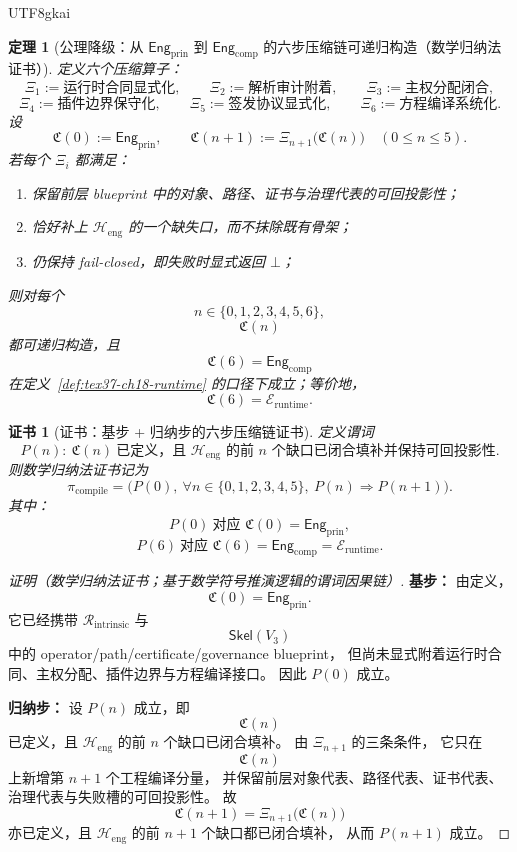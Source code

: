 \documentclass[12pt]{article}
\newtheorem{theorem}{定理}[section]
\newtheorem{Certificate}{证书}[section]
\begin{document}
\begin{CJK*}{UTF8}{gkai}
\begin{theorem}[公理降级：从 $\mathsf{Eng}_{\mathrm{prin}}$ 到 $\mathsf{Eng}_{\mathrm{comp}}$ 的六步压缩链可递归构造（数学归纳法证书）]
\label{thm:tex37-ch18-downgrade}
定义六个压缩算子：
\[
  \Xi_1:=\text{运行时合同显式化},
  \qquad
  \Xi_2:=\text{解析审计附着},
  \qquad
  \Xi_3:=\text{主权分配闭合},
\]
\[
  \Xi_4:=\text{插件边界保守化},
  \qquad
  \Xi_5:=\text{签发协议显式化},
  \qquad
  \Xi_6:=\text{方程编译系统化}.
\]
设
\[
  \mathfrak C(0):=\mathsf{Eng}_{\mathrm{prin}},
  \qquad
  \mathfrak C(n+1):=\Xi_{n+1}\bigl(\mathfrak C(n)\bigr)
  \quad (0\le n\le 5).
\]
若每个 $\Xi_i$ 都满足：
\begin{enumerate}
  \item 保留前层 blueprint 中的对象、路径、证书与治理代表的可回投影性；
  \item 恰好补上 $\mathcal H_{\mathrm{eng}}$ 的一个缺失口，而不抹除既有骨架；
  \item 仍保持 fail-closed，即失败时显式返回 $\bot$；
\end{enumerate}
则对每个
\[
  n\in\{0,1,2,3,4,5,6\},
\]
\[
  \mathfrak C(n)
\]
都可递归构造，且
\[
  \mathfrak C(6)=\mathsf{Eng}_{\mathrm{comp}}
\]
在定义~\ref{def:tex37-ch18-runtime} 的口径下成立；等价地，
\[
  \mathfrak C(6)=\mathcal{E}_{\mathrm{runtime}}.
\]
\end{theorem}

\begin{Certificate}[证书：基步 + 归纳步的六步压缩链证书]
\label{cert:tex37-ch18-downgrade}
定义谓词
\[
  P(n):\ \mathfrak C(n)\ \text{已定义，且 }\mathcal H_{\mathrm{eng}}\text{ 的前 $n$ 个缺口已闭合填补并保持可回投影性}.
\]
则数学归纳法证书记为
\[
  \pi_{\mathrm{compile}}
  =
  \bigl(
    P(0),\
    \forall n\in\{0,1,2,3,4,5\},\ P(n)\Rightarrow P(n+1)
  \bigr).
\]
其中：
\[
  P(0)\ \text{对应 }\mathfrak C(0)=\mathsf{Eng}_{\mathrm{prin}},
\]
\[
  P(6)\ \text{对应 }\mathfrak C(6)=\mathsf{Eng}_{\mathrm{comp}}=\mathcal{E}_{\mathrm{runtime}}.
\]
\end{Certificate}

\begin{proof}[证明（数学归纳法证书；基于数学符号推演逻辑的谓词因果链）]
\textbf{基步：}
由定义，
\[
  \mathfrak C(0)=\mathsf{Eng}_{\mathrm{prin}}.
\]
它已经携带 $\mathcal{R}_{\mathrm{intrinsic}}$ 与
\[
  \mathsf{Skel}(V_3)
\]
中的 operator/path/certificate/governance blueprint，
但尚未显式附着运行时合同、主权分配、插件边界与方程编译接口。
因此 $P(0)$ 成立。

\textbf{归纳步：}
设 $P(n)$ 成立，即
\[
  \mathfrak C(n)
\]
已定义，且 $\mathcal H_{\mathrm{eng}}$ 的前 $n$ 个缺口已闭合填补。
由 $\Xi_{n+1}$ 的三条条件，
它只在
\[
  \mathfrak C(n)
\]
上新增第 $n+1$ 个工程编译分量，
并保留前层对象代表、路径代表、证书代表、治理代表与失败槽的可回投影性。
故
\[
  \mathfrak C(n+1)=\Xi_{n+1}\bigl(\mathfrak C(n)\bigr)
\]
亦已定义，且 $\mathcal H_{\mathrm{eng}}$ 的前 $n+1$ 个缺口都已闭合填补，
从而 $P(n+1)$ 成立。


\end{proof}
\end{CJK*}
\end{document}
